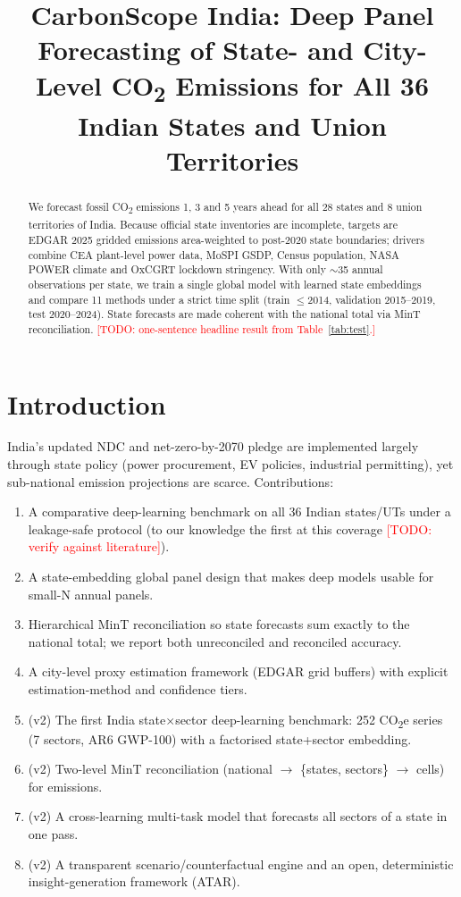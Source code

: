 \documentclass[conference]{IEEEtran}
\newcommand{\todo}[1]{\textcolor{red}{[TODO: #1]}}
\begin{document}
\title{CarbonScope India: Deep Panel Forecasting of State- and City-Level CO\textsubscript{2} Emissions for All 36 Indian States and Union Territories}
\author{\IEEEauthorblockN{\todo{Author names}}\IEEEauthorblockA{\todo{Affiliation}}}
\maketitle

\begin{abstract}
We forecast fossil CO\textsubscript{2} emissions 1, 3 and 5 years ahead for all 28 states and 8 union territories of India.
Because official state inventories are incomplete, targets are EDGAR 2025 gridded emissions area-weighted to post-2020
state boundaries; drivers combine CEA plant-level power data, MoSPI GSDP, Census population, NASA POWER climate and
OxCGRT lockdown stringency. With only $\sim$35 annual observations per state, we train a single global model with learned
state embeddings and compare 11 methods under a strict time split (train $\le$2014, validation 2015--2019, test 2020--2024).
State forecasts are made coherent with the national total via MinT reconciliation. \todo{one-sentence headline result from Table~\ref{tab:test}.}
\end{abstract}

\section{Introduction}
India's updated NDC and net-zero-by-2070 pledge are implemented largely through state policy (power procurement,
EV policies, industrial permitting), yet sub-national emission projections are scarce. Contributions:
\begin{enumerate}
\item A comparative deep-learning benchmark on all 36 Indian states/UTs under a leakage-safe protocol
      (to our knowledge the first at this coverage \todo{verify against literature}).
\item A state-embedding global panel design that makes deep models usable for small-N annual panels.
\item Hierarchical MinT reconciliation so state forecasts sum exactly to the national total; we report both
      unreconciled and reconciled accuracy.
\item A city-level proxy estimation framework (EDGAR grid buffers) with explicit estimation-method and confidence tiers.
\item (v2) The first India state$\times$sector deep-learning benchmark: 252 CO\textsubscript{2}e series (7 sectors,
      AR6 GWP-100) with a factorised state+sector embedding.
\item (v2) Two-level MinT reconciliation (national $\rightarrow$ \{states, sectors\} $\rightarrow$ cells) for emissions.
\item (v2) A cross-learning multi-task model that forecasts all sectors of a state in one pass.
\item (v2) A transparent scenario/counterfactual engine and an open, deterministic insight-generation framework (ATAR).
\end{enumerate}
\end{document}
